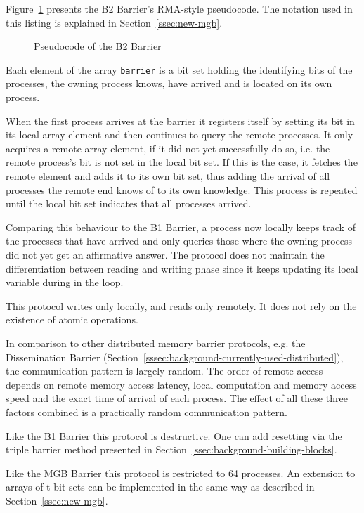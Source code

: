 \documentclass[a4paper, 10pt]{article}
\begin{document}
Figure~\ref{fig:pseudocode-b2} presents the B2 Barrier's RMA-style pseudocode. The notation used in this listing is explained in Section~\ref{ssec:new-mgb}.

\begin{figure}[htbp]
	\centering
	
	\caption{Pseudocode of the B2 Barrier}
	\label{fig:pseudocode-b2}
\end{figure}

Each element of the array \texttt{barrier} is a bit set holding the identifying bits of the processes, the owning process knows, have arrived and is located on its own process.

When the first process arrives at the barrier it registers itself by setting its bit in its local array element and then continues to query the remote processes. It only acquires a remote array element, if it did not yet successfully do so, i.e. the remote process's bit is not set in the local bit set. If this is the case, it fetches the remote element and adds it to its own bit set, thus adding the arrival of all processes the remote end knows of to its own knowledge. This process is repeated until the local bit set indicates that all processes arrived.

Comparing this behaviour to the B1 Barrier, a process now locally keeps track of the processes that have arrived and only queries those where the owning process did not yet get an affirmative answer.
The protocol does not maintain the differentiation between reading and writing phase since it keeps updating its local variable during in the loop.

This protocol writes only locally, and reads only remotely. It does not rely on the existence of atomic operations.

In comparison to other distributed memory barrier protocols, e.g. the Dissemination Barrier (Section~\ref{sssec:background-currently-used-distributed}), the communication pattern is largely random. The order of remote access depends on remote memory access latency, local computation and memory access speed and the exact time of arrival of each process. The effect of all these three factors combined is a practically random communication pattern.

Like the B1 Barrier this protocol is destructive. One can add resetting via the triple barrier method presented in Section~\ref{ssec:background-building-blocks}.

Like the MGB Barrier this protocol is restricted to 64 processes. An extension to arrays of t bit sets can be implemented in the same way as described in Section~\ref{ssec:new-mgb}.
\end{document}
